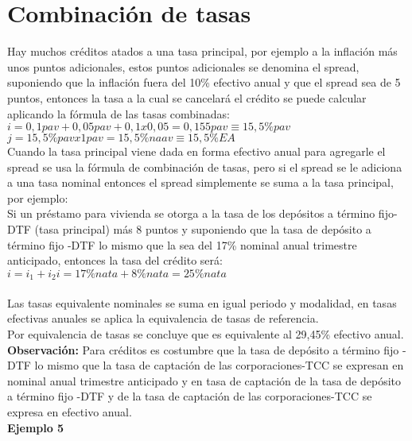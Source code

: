 	
	\section{Combinación de tasas}
	Hay muchos créditos atados a una tasa principal, por ejemplo a la inflación más unos puntos adicionales, estos puntos adicionales se denomina el spread, suponiendo que la inflación fuera del 10\% efectivo anual y que el spread sea de 5 puntos, entonces la tasa a la cual se cancelará el crédito se puede calcular aplicando la fórmula de las tasas combinadas: \\
	
	$i= 0,1 pav + 0,05 pav + 0,1 x 0,05 = 0,155 pav \equiv 15,5\% pav $ \rightarrow  $j = 15,5\% pav x1 pav = 15,5\%naav \equiv 15,5 \%EA$ \\
	
	Cuando la tasa principal viene dada en forma efectivo anual para agregarle el spread se usa la fórmula de combinación de tasas, pero si el spread se le adiciona a una tasa nominal entonces el spread simplemente se suma a la tasa principal, por ejemplo: \\
	
	Si un préstamo para vivienda se otorga a la tasa de los depósitos a término fijo-DTF (tasa principal) más 8 puntos y suponiendo que la tasa de depósito a término fijo -DTF lo mismo que la sea del 17\% nominal anual trimestre anticipado, entonces la tasa del crédito será: \\
	
	$i = i_{1} + i_{2}
i = 17\%nata + 8\%nata = 25\% nata$\\\\ Las tasas equivalente nominales se suma en igual periodo y modalidad, en tasas efectivas anuales se aplica la equivalencia de tasas de referencia.\\
	
	Por equivalencia de tasas se concluye que es equivalente al 29,45\% efectivo anual.\\
	
	\textbf{Observación:} Para créditos es costumbre que la tasa de depósito a término fijo -DTF lo mismo que la tasa de captación de las corporaciones-TCC se expresan en nominal anual trimestre anticipado y en tasa de captación de la tasa de depósito a término fijo -DTF y de la tasa de captación de las corporaciones-TCC se expresa en efectivo anual.\\
	
	
	
	\textbf{Ejemplo 5}\\
	
